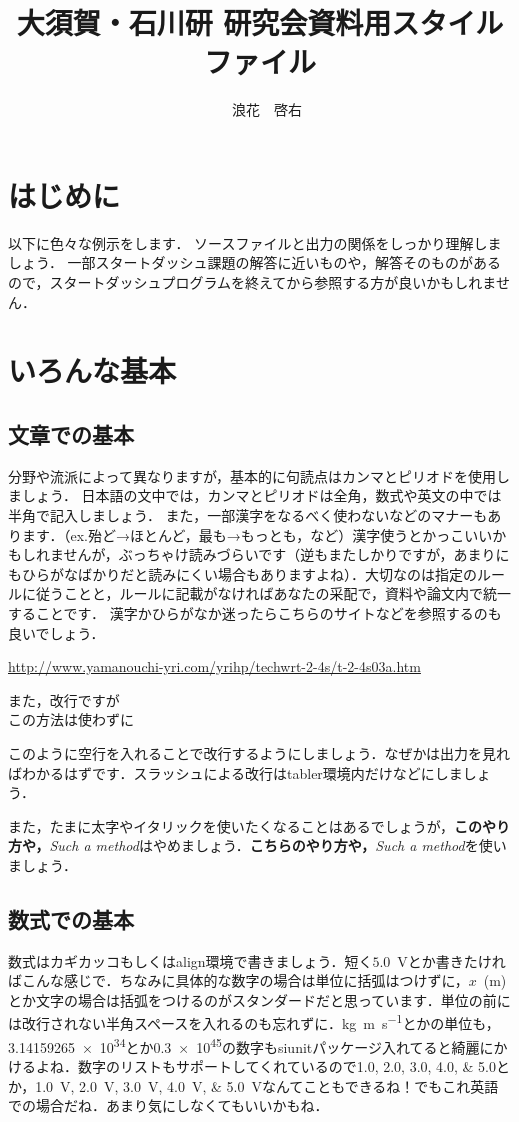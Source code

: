 \documentclass[a4j]{jsarticle}
\title{大須賀・石川研 研究会資料用スタイルファイル}
\author{
    　浪花　啓右
     }
\begin{document}
\maketitle
\thispagestyle{empty}
%
\section{はじめに}
以下に色々な例示をします．
ソースファイルと出力の関係をしっかり理解しましょう．
一部スタートダッシュ課題の解答に近いものや，解答そのものがあるので，スタートダッシュプログラムを終えてから参照する方が良いかもしれません．

\section{いろんな基本}
\subsection{文章での基本}
分野や流派によって異なりますが，基本的に句読点はカンマとピリオドを使用しましょう．
日本語の文中では，カンマとピリオドは全角，数式や英文の中では半角で記入しましょう．
また，一部漢字をなるべく使わないなどのマナーもあります．（ex.殆ど→ほとんど，最も→もっとも，など）漢字使うとかっこいいかもしれませんが，ぶっちゃけ読みづらいです（逆もまたしかりですが，あまりにもひらがなばかりだと読みにくい場合もありますよね）．大切なのは指定のルールに従うことと，ルールに記載がなければあなたの采配で，資料や論文内で統一することです．
漢字かひらがなか迷ったらこちらのサイトなどを参照するのも良いでしょう．

\url{http://www.yamanouchi-yri.com/yrihp/techwrt-2-4s/t-2-4s03a.htm}


また，改行ですが\\
この方法は使わずに

このように空行を入れることで改行するようにしましょう．なぜかは出力を見ればわかるはずです．スラッシュによる改行はtabler環境内だけなどにしましょう．

また，たまに太字やイタリックを使いたくなることはあるでしょうが，{\bf このやり方や，}{\it Such a method}はやめましょう．\textbf{こちらのやり方や，}\textit{Such a method}を使いましょう．

\subsection{数式での基本}

数式はカギカッコもしくはalign環境で書きましょう．短く$5.0$~Vとか書きたければこんな感じで．ちなみに具体的な数字の場合は単位に括弧はつけずに，$x$~(m)とか文字の場合は括弧をつけるのがスタンダードだと思っています．単位の前には改行されない半角スペースを入れるのも忘れずに．\si{kg.m.s^{-1}}とかの単位も，\num{3.14159265e34}とか\num{.3e45}の数字もsiunitパッケージ入れてると綺麗にかけるよね．数字のリストもサポートしてくれているので\numlist{ 1.0; 2.0; 3.0; 4.0; 5.0}とか，\SIlist{ 1.0; 2.0; 3.0; 4.0; 5.0}{\volt}なんてこともできるね！でもこれ英語での場合だね．あまり気にしなくてもいいかもね．
\end{document}
